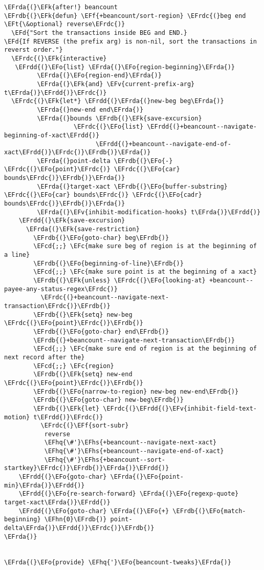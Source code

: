 \documentclass[a4wide,10pt]{article}
\newcommand{\EFc}[1]{\textcolor{EFc}{#1}} %
\newcommand{\EFcd}[1]{\textcolor{EFcd}{#1}} %
\newcommand{\EFd}[1]{\textcolor{EFd}{#1}} %
\newcommand{\EFk}[1]{\textcolor{EFk}{#1}} %
\newcommand{\EFf}[1]{\textcolor{EFf}{#1}} %
\newcommand{\EFv}[1]{\textcolor{EFv}{#1}} %
\newcommand{\EFt}[1]{\textcolor{EFt}{#1}} %
\newcommand{\EFo}[1]{\textcolor{EFo}{#1}} %
\newcommand{\EFhn}[1]{\textcolor{EFhn}{\textbf{#1}}} %
\newcommand{\EFhq}[1]{\textcolor{EFhq}{#1}} %
\newcommand{\EFhs}[1]{\textcolor{EFhs}{#1}} %
\newcommand{\EFrda}[1]{\textcolor{EFrda}{#1}} %
\newcommand{\EFrdb}[1]{\textcolor{EFrdb}{#1}} %
\newcommand{\EFrdc}[1]{\textcolor{EFrdc}{#1}} %
\newcommand{\EFrdd}[1]{\textcolor{EFrdd}{#1}} %
\begin{document}
\begin{Code}
\begin{Verbatim}
\EFrda{(}\EFk{after!} beancount
\EFrdb{(}\EFk{defun} \EFf{+beancount/sort-region} \EFrdc{(}beg end \EFt{\&optional} reverse\EFrdc{)}
  \EFd{"Sort the transactions inside BEG and END.}
\EFd{If REVERSE (the prefix arg) is non-nil, sort the transactions in reverst order."}
  \EFrdc{(}\EFk{interactive}
   \EFrdd{(}\EFo{list} \EFrda{(}\EFo{region-beginning}\EFrda{)}
         \EFrda{(}\EFo{region-end}\EFrda{)}
         \EFrda{(}\EFk{and} \EFv{current-prefix-arg} t\EFrda{)}\EFrdd{)}\EFrdc{)}
  \EFrdc{(}\EFk{let*} \EFrdd{(}\EFrda{(}new-beg beg\EFrda{)}
         \EFrda{(}new-end end\EFrda{)}
         \EFrda{(}bounds \EFrdb{(}\EFk{save-excursion}
                   \EFrdc{(}\EFo{list} \EFrdd{(}+beancount--navigate-beginning-of-xact\EFrdd{)}
                         \EFrdd{(}+beancount--navigate-end-of-xact\EFrdd{)}\EFrdc{)}\EFrdb{)}\EFrda{)}
         \EFrda{(}point-delta \EFrdb{(}\EFo{-} \EFrdc{(}\EFo{point}\EFrdc{)} \EFrdc{(}\EFo{car} bounds\EFrdc{)}\EFrdb{)}\EFrda{)}
         \EFrda{(}target-xact \EFrdb{(}\EFo{buffer-substring} \EFrdc{(}\EFo{car} bounds\EFrdc{)} \EFrdc{(}\EFo{cadr} bounds\EFrdc{)}\EFrdb{)}\EFrda{)}
         \EFrda{(}\EFv{inhibit-modification-hooks} t\EFrda{)}\EFrdd{)}
    \EFrdd{(}\EFk{save-excursion}
      \EFrda{(}\EFk{save-restriction}
        \EFrdb{(}\EFo{goto-char} beg\EFrdb{)}
        \EFcd{;;} \EFc{make sure beg of region is at the beginning of a line}
        \EFrdb{(}\EFo{beginning-of-line}\EFrdb{)}
        \EFcd{;;} \EFc{make sure point is at the beginning of a xact}
        \EFrdb{(}\EFk{unless} \EFrdc{(}\EFo{looking-at} +beancount--payee-any-status-regex\EFrdc{)}
          \EFrdc{(}+beancount--navigate-next-transaction\EFrdc{)}\EFrdb{)}
        \EFrdb{(}\EFk{setq} new-beg \EFrdc{(}\EFo{point}\EFrdc{)}\EFrdb{)}
        \EFrdb{(}\EFo{goto-char} end\EFrdb{)}
        \EFrdb{(}+beancount--navigate-next-transaction\EFrdb{)}
        \EFcd{;;} \EFc{make sure end of region is at the beginning of next record after the}
        \EFcd{;;} \EFc{region}
        \EFrdb{(}\EFk{setq} new-end \EFrdc{(}\EFo{point}\EFrdc{)}\EFrdb{)}
        \EFrdb{(}\EFo{narrow-to-region} new-beg new-end\EFrdb{)}
        \EFrdb{(}\EFo{goto-char} new-beg\EFrdb{)}
        \EFrdb{(}\EFk{let} \EFrdc{(}\EFrdd{(}\EFv{inhibit-field-text-motion} t\EFrdd{)}\EFrdc{)}
          \EFrdc{(}\EFf{sort-subr}
           reverse
           \EFhq{\#'}\EFhs{+beancount--navigate-next-xact}
           \EFhq{\#'}\EFhs{+beancount--navigate-end-of-xact}
           \EFhq{\#'}\EFhs{+beancount--sort-startkey}\EFrdc{)}\EFrdb{)}\EFrda{)}\EFrdd{)}
    \EFrdd{(}\EFo{goto-char} \EFrda{(}\EFo{point-min}\EFrda{)}\EFrdd{)}
    \EFrdd{(}\EFo{re-search-forward} \EFrda{(}\EFo{regexp-quote} target-xact\EFrda{)}\EFrdd{)}
    \EFrdd{(}\EFo{goto-char} \EFrda{(}\EFo{+} \EFrdb{(}\EFo{match-beginning} \EFhn{0}\EFrdb{)} point-delta\EFrda{)}\EFrdd{)}\EFrdc{)}\EFrdb{)}
\EFrda{)}


\EFrda{(}\EFo{provide} \EFhq{'}\EFo{beancount-tweaks}\EFrda{)}
\end{Verbatim}
\end{Code}
\end{document}
